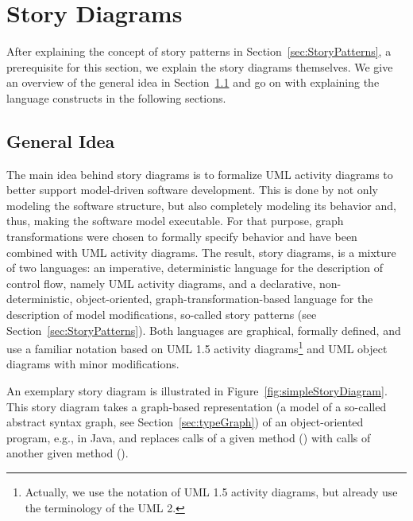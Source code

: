 \section{Story Diagrams} \label{sec:StoryDiagrams}

After explaining the concept of story patterns in Section~\ref{sec:StoryPatterns}, a prerequisite for this section, we explain the story diagrams themselves.
We give an overview of the general idea in Section~\ref{sec:IdeaStoryDiagrams} and go on with explaining the language constructs in the following sections.

\subsection{General Idea}\label{sec:IdeaStoryDiagrams}


The main idea behind story diagrams is to formalize UML activity diagrams
to better support model-driven software development.
This is done by not only modeling the software structure, but also completely modeling its behavior and, thus, making the software model executable.
For that purpose, graph transformations were chosen to formally specify behavior and have been combined with UML activity diagrams.
The result, story diagrams, is a mixture of two languages:
an imperative, deterministic language for the description of control flow, namely UML activity diagrams,
and a declarative, non-deterministic, object-oriented, graph-transformation-based language for the description of model modifications, so-called story patterns (see Section~\ref{sec:StoryPatterns}).
Both languages are graphical, formally defined, and use a familiar notation based on UML 1.5 activity diagrams\footnote{Actually,
we use the notation of UML 1.5 activity diagrams, but already use the terminology of the UML 2.}
and UML object diagrams with minor modifications.

An exemplary story diagram is illustrated in Figure~\ref{fig:simpleStoryDiagram}.
This story diagram takes a graph-based representation (a model of a so-called abstract syntax graph, see Section~\ref{sec:typeGraph}) of an object-oriented program, e.g., in Java,
and replaces calls of a given method () with calls of another given method ().

